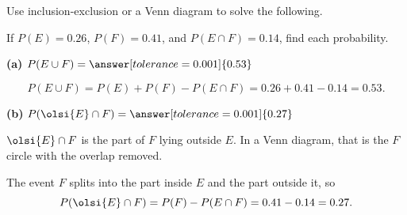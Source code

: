 \documentclass[12pt]{ximera}
\begin{document}
\begin{problem}
Use inclusion-exclusion or a Venn diagram to solve the following.

If $P(E)=0.26$, $P(F)=0.41$, and $P(E\cap F)=0.14$, find each probability.

\begin{prompt}
\textbf{(a)} $P(E\cup F) = \answer[tolerance=0.001]{0.53}$

\begin{feedback}
\[ P(E\cup F)=P(E)+P(F)-P(E\cap F)=0.26+0.41-0.14=0.53. \]
\end{feedback}
\end{prompt}

\begin{prompt}
\textbf{(b)} $P\!\left(\olsi{E}\cap F\right) = \answer[tolerance=0.001]{0.27}$

\begin{hint}
$\olsi{E}\cap F$ is the part of $F$ lying outside $E$. In a Venn diagram, that is the
$F$ circle with the overlap removed.
\end{hint}

\begin{feedback}
The event $F$ splits into the part inside $E$ and the part outside it, so
\[ P\!\left(\olsi{E}\cap F\right)=P(F)-P(E\cap F)=0.41-0.14=0.27. \]
\end{feedback}
\end{prompt}
\end{problem}
\end{document}

